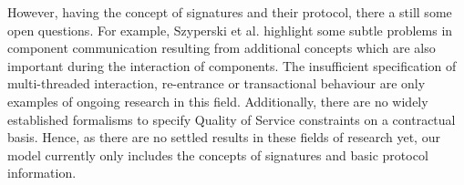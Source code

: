 However, having the concept of signatures and their protocol, there a still some open questions. For example, Szyperski et al. \cite{szyperski2002a} highlight some subtle problems in component communication resulting from additional concepts which are also important during the interaction of components. The insufficient specification of multi-threaded interaction, re-entrance or transactional behaviour are only examples of ongoing research in this field. Additionally, there are no widely established formalisms to specify Quality of Service constraints on a contractual basis. Hence, as there are no settled results in these fields of research yet, our model currently only includes the concepts of signatures and basic protocol information.